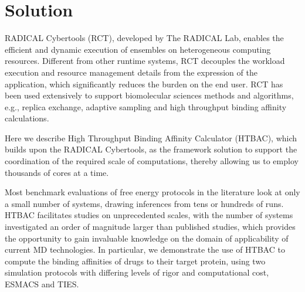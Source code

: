 \documentclass[conference]{IEEEtran}
\begin{document}
\section{Solution}\label{sec:solution}


RADICAL Cybertools (RCT), developed by The RADICAL Lab, enables the
efficient and dynamic execution of ensembles on heterogeneous computing
resources. Different from other runtime systems, RCT decouples the workload
execution and resource management details from the expression of the
application, which significantly reduces the burden on the end user.
RCT has been used extensively to support
biomolecular sciences methods and algorithms, e.g., replica exchange, adaptive
sampling and high throughput binding affinity calculations.

Here we describe High Throughput Binding Affinity Calculator (HTBAC),
which builds upon the RADICAL Cybertools, as the framework solution to support
the coordination of the required scale of computations, thereby
allowing us to employ thousands of cores at a time.

Most benchmark evaluations of free energy protocols in the literature look
at only a small number of systems, drawing inferences from tens or hundreds
of runs. HTBAC facilitates studies on unprecedented scales, with the number
of systems investigated an order of magnitude larger than published studies,
which provides the opportunity to gain invaluable knowledge on the domain of
applicability of current MD technologies. In particular, we demonstrate the
use of HTBAC to compute the binding affinities of drugs to their
target protein, using two simulation protocols with differing
levels of rigor and computational cost, ESMACS and TIES.
\end{document}
